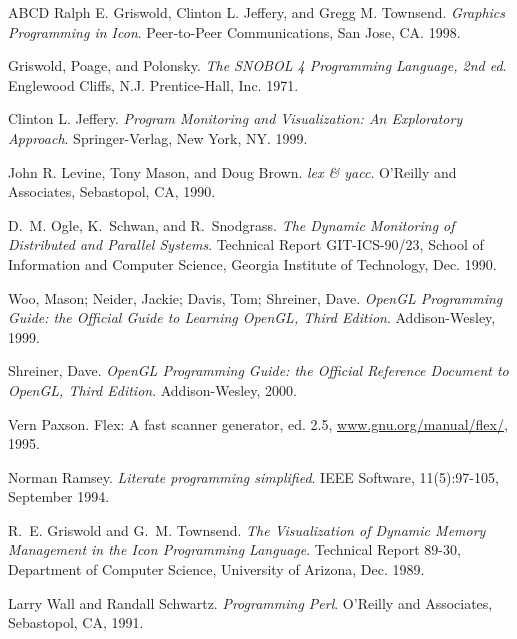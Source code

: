 \begin{thebibliography}{ABCD}
   Ralph E. Griswold, Clinton L. Jeffery, and Gregg
    M. Townsend. \emph{Graphics Programming in Icon}. Peer-to-Peer
    Communications, San Jose, CA. 1998.

   Griswold, Poage, and Polonsky.
    \emph{The SNOBOL 4 Programming Language, 2nd ed}.
    Englewood Cliffs, N.J. Prentice-Hall, Inc. 1971.

   Clinton L. Jeffery.
    \emph{Program Monitoring and Visualization: An Exploratory Approach}.
    Springer-Verlag, New York, NY. 1999.

   John R. Levine, Tony Mason, and Doug Brown.
    \emph{lex \& yacc}. O'Reilly and Associates, Sebastopol, CA, 1990.

 D.~M. Ogle, K.~Schwan, and R.~Snodgrass.
\emph{The {D}ynamic {M}onitoring of {D}istributed and {P}arallel {S}ystems}.
Technical Report GIT-ICS-90/23, School of Information and Computer    
  Science, Georgia Institute of Technology, Dec. 1990.

   Woo, Mason; Neider, Jackie; Davis, Tom; Shreiner, Dave.
    \emph{OpenGL Programming Guide: the Official Guide to Learning OpenGL, Third
      Edition}. Addison-Wesley, 1999.

   Shreiner, Dave.
   \emph{OpenGL Programming Guide: the Official
    Reference Document to OpenGL, Third Edition}.  Addison-Wesley, 2000.

   Vern Paxson. {Flex: A fast scanner generator, ed. 2.5},
    \url{www.gnu.org/manual/flex/}, 1995.

   Norman Ramsey. \emph{Literate programming simplified}.
    IEEE Software, 11(5):97-105, September 1994.

 R.~E. Griswold and G.~M. Townsend.
\emph{The {V}isualization of {D}ynamic {M}emory {M}anagement in the {I}con  
  {P}rogramming {L}anguage}.
\newblock Technical Report 89-30, Department of Computer Science, University of 
  Arizona, Dec. 1989.

   Larry Wall and Randall Schwartz. \emph{Programming
    Perl}.  O'Reilly and Associates, Sebastopol, CA, 1991.

\end{thebibliography}
